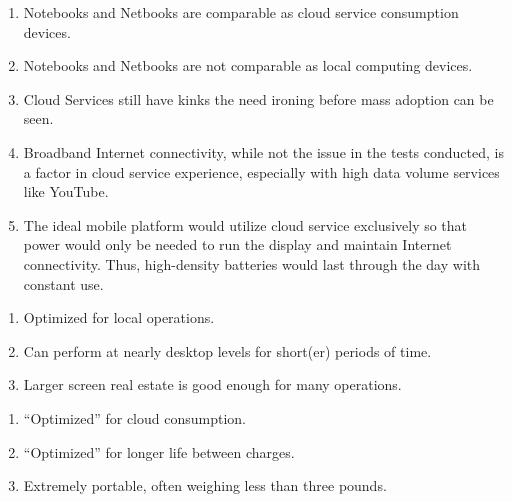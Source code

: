 \documentclass[letterpaper]{article}
\begin{document}
{\begin{center}
\end{center}

\begin{enumerate}

\item Notebooks and Netbooks are comparable as cloud service consumption
  devices.

\item Notebooks and Netbooks are not comparable as local computing devices.

\item Cloud Services still have kinks the need ironing before mass adoption can
  be seen.

\item Broadband Internet connectivity, while not the issue in the tests
  conducted, is a factor in cloud service experience, especially with high data
  volume services like YouTube.

\item The ideal mobile platform would utilize cloud service exclusively so that
  power would only be needed to run the display and maintain Internet
  connectivity.  Thus, high-density batteries would last through the day with
  constant use.

\end{enumerate}

\newpage


\begin{enumerate}

\item Optimized for local operations.

\item Can perform at nearly desktop levels for short(er) periods of time.

\item Larger screen real estate is good enough for many operations.

\end{enumerate}

\newpage

\begin{enumerate}


\item ``Optimized'' for cloud consumption.

\item ``Optimized'' for longer life between charges.

\item Extremely portable, often weighing less than three pounds.


\end{enumerate}}
\end{document}
